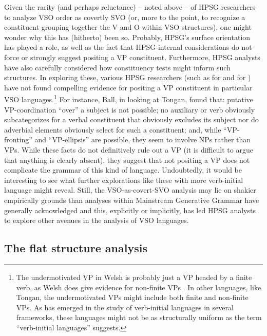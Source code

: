 \documentclass[output=paper]{langsci/langscibook}
\begin{document}
{Given the rarity (and perhaps reluctance) -- noted above -- of HPSG researchers to analyze VSO order as covertly SVO (or, more to the point, to recognize a constituent grouping together the V and O within VSO structures), one might wonder why this has (hitherto) been so. Probably, HPSG's surface orientation has played a role, as well as the fact that HPSG-internal considerations do not force or strongly suggest positing a VP constituent. Furthermore, HPSG analysts have also carefully considered how constituency tests might inform such structures. In exploring these, various HPSG researchers (such as \citealt{borsley06} for  and \citealt[Chapter 3]{ball08thesis} for ) have not found compelling evidence for positing a VP constituent in particular VSO languages.\footnote{The undermotivated VP in Welsh is probably just a VP headed by a finite verb, as Welsh does give evidence for non-finite VPs \citep{BTW07}. In other languages, like Tongan, the undermotivated VPs might include both finite and non-finite VPs. As has emerged in the study of verb-initial languages in several frameworks, these languages might not be as structurally uniform as the term ``verb-initial languages'' suggests.} For instance, Ball, in looking at Tongan, found that: putative VP-coordination ``over'' a subject is not possible; no auxiliary or verb obviously subcategorizes for a verbal constituent that obviously excludes its subject nor do adverbial elements obviously select for such a constituent; and, while ``VP-fronting'' and ``VP-ellipsis'' are possible, they seem to involve NPs rather than VPs. While these facts do not definitively rule out a VP (it is difficult to argue that anything is clearly absent), they suggest that not positing a VP does not complicate the grammar of this kind of language. Undoubtedly, it would be interesting to see what further explorations like these with more verb-initial language might reveal. Still, the VSO-as-covert-SVO analysis may lie on shakier empirically grounds than analyses within Mainstream Generative Grammar have generally acknowledged and this, explicitly or implicitly, has led HPSG analysts to explore other avenues in the analysis of VSO languages.           

\subsection{The flat structure analysis} \label{flat}

}
\end{document}
